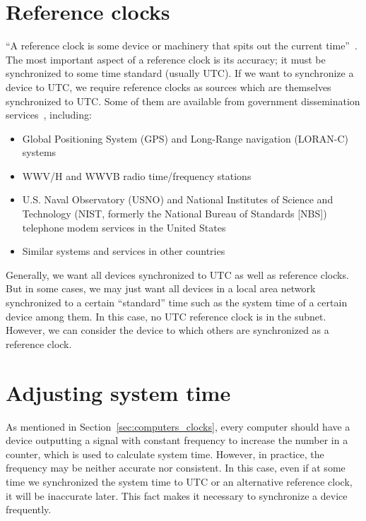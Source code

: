 \section{Reference clocks}%
\label{sec:reference_clocks}
``A reference clock is some device or machinery that spits out the current
time''~\cite{reference_clock}.
The most important aspect of a reference clock is its accuracy; it must be
synchronized to some time standard (usually UTC\null). If we want to
synchronize a device to UTC, we require reference clocks as sources which are
themselves synchronized to UTC\null. Some of them are
available from government dissemination services~\cite{redbook}, including:
\begin{itemize}
    \item Global Positioning System (GPS) and Long-Range navigation (LORAN-C)
        systems
    \item WWV/H and WWVB radio time/frequency stations
    \item U.S. Naval Observatory (USNO) and National Institutes of Science and
        Technology (NIST\null, formerly the National Bureau of Standards [NBS])
        telephone modem services in the United States
    \item Similar systems and services in other countries
\end{itemize}
Generally, we want all devices synchronized to UTC as well as reference clocks.
But in some cases, we may just want all devices in a local area network
synchronized to a certain ``standard'' time such as the system time of a
certain device among them. In this case, no UTC reference clock is in the
subnet. However, we can consider the device to which others are synchronized as
a reference clock. 

\section{Adjusting system time}%
\label{sec:adjusting_system_time}
As mentioned in Section~\ref{sec:computers_clocks}, every computer should have
a device outputting a signal with constant frequency to increase the number in
a counter, which is used to calculate system time. However, in practice, the
frequency may be neither accurate nor consistent. In this case, even if at some
time we synchronized the system time to UTC or an alternative reference clock,
it will be inaccurate later. This fact makes it necessary to synchronize a
device frequently.

